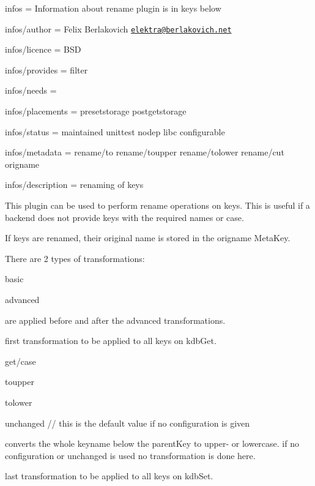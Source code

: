 
\begin{DoxyItemize}
\item infos = Information about rename plugin is in keys below
\item infos/author = Felix Berlakovich \href{mailto:elektra@berlakovich.net}{\tt elektra@berlakovich.\+net}
\item infos/licence = B\+SD
\item infos/provides = filter
\item infos/needs =
\item infos/placements = presetstorage postgetstorage
\item infos/status = maintained unittest nodep libc configurable
\item infos/metadata = rename/to rename/toupper rename/tolower rename/cut origname
\item infos/description = renaming of keys
\end{DoxyItemize}

This plugin can be used to perform rename operations on keys. This is useful if a backend does not provide keys with the required names or case.

If keys are renamed, their original name is stored in the {\ttfamily origname} Meta\+Key.

There are 2 types of transformations\+:


\begin{DoxyItemize}
\item basic
\item advanced
\end{DoxyItemize}

are applied before and after the advanced transformations.

first transformation to be applied to all keys on kdb\+Get.

{\ttfamily get/case}


\begin{DoxyItemize}
\item toupper
\item tolower
\item unchanged // this is the default value if no configuration is given
\end{DoxyItemize}

converts the whole keyname below the parent\+Key to upper-\/ or lowercase. if no configuration or {\ttfamily unchanged} is used no transformation is done here.

last transformation to be applied to all keys on kdb\+Set.

